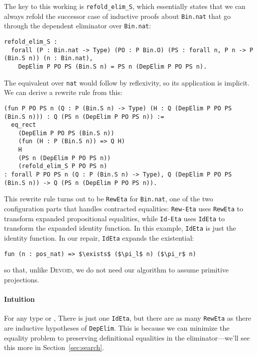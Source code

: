 The key to this working is \lstinline{refold_elim_S}, which essentially states that
we can always refold the successor case of inductive proofs about \lstinline{Bin.nat}
that go through the dependent eliminator over \lstinline{Bin.nat}:

\begin{lstlisting}
refold_elim_S :
  forall (P : Bin.nat -> Type) (PO : P Bin.O) (PS : forall n, P n -> P (Bin.S n)) (n : Bin.nat),
    DepElim P PO PS (Bin.S n) = PS n (DepElim P PO PS n).
\end{lstlisting}
The equivalent over \lstinline{nat} would follow by reflexivity, so its application is implicit.
We can derive a rewrite rule from this:

\begin{lstlisting}
(fun P PO PS n (Q : P (Bin.S n) -> Type) (H : Q (DepElim P PO PS (Bin.S n))) : Q (PS n (DepElim P PO PS n)) :=
  eq_rect
    (DepElim P PO PS (Bin.S n))
    (fun (H : P (Bin.S n)) => Q H)
    H
    (PS n (DepElim P PO PS n))
    (refold_elim_S P PO PS n)
: forall P PO PS n (Q : P (Bin.S n) -> Type), Q (DepElim P PO PS (Bin.S n)) -> Q (PS n (DepElim P PO PS n)).
\end{lstlisting}
This rewrite rule turns out to be \lstinline{RewEta} for \lstinline{Bin.nat}, one of the two configuration parts that 
handles contracted equalities:
\lstinline{Rew-Eta} uses \lstinline{RewEta} to transform expanded propositional equalities, while
\lstinline{Id-Eta} uses \lstinline{IdEta} to transform the expanded identity function.
In this example, \lstinline{IdEta} is just the identity function.
In our repair, \lstinline{IdEta} expands the existential:

\begin{lstlisting}
fun (n : pos_nat) => $\exists$ ($\pi_l$ n) ($\pi_r$ n)
\end{lstlisting}
so that, unlike \textsc{Devoid}, we do not need our algorithm to assume primitive projections.

\paragraph{Intuition}

For any type \A or \B,
There is just one \lstinline{IdEta}, but there are as many \lstinline{RewEta} as there are
inductive hypotheses of \lstinline{DepElim}.
This is because we can minimize the equality problem to preserving definitional equalities
in the eliminator---we'll see this more in Section~\ref{sec:search}.

